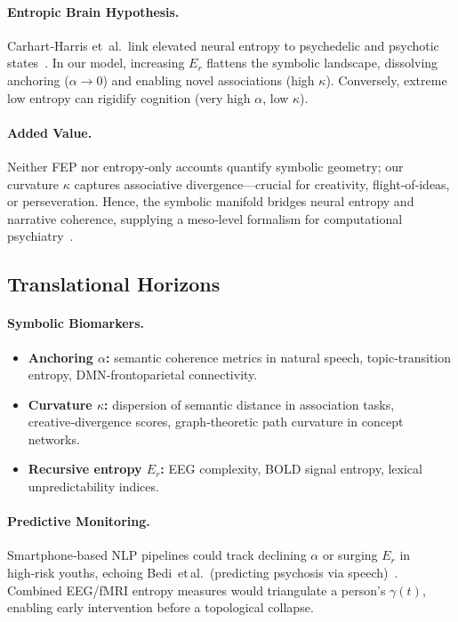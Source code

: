 \paragraph{Entropic Brain Hypothesis.}  Carhart‑Harris et al.\ link elevated neural entropy to psychedelic and psychotic states \cite{carhart2014entropic}. In our model, increasing $E_r$ flattens the symbolic landscape, dissolving anchoring ($\alpha \to 0$) and enabling novel associations (high $\kappa$). Conversely, extreme low entropy can rigidify cognition (very high $\alpha$, low $\kappa$).

\paragraph{Added Value.}  Neither FEP nor entropy‑only accounts quantify symbolic geometry; our curvature $\kappa$ captures associative divergence—crucial for creativity, flight‑of‑ideas, or perseveration. Hence, the symbolic manifold bridges neural entropy and narrative coherence, supplying a meso‑level formalism for computational psychiatry \cite{adams2016comp}.

\subsection*{Translational Horizons}

\paragraph{Symbolic Biomarkers.} 
\begin{itemize}
    \item \textbf{Anchoring $\alpha$:} semantic coherence metrics in natural speech, topic‑transition entropy, DMN‑frontoparietal connectivity.  
    \item \textbf{Curvature $\kappa$:} dispersion of semantic distance in association tasks, creative‑divergence scores, graph‑theoretic path curvature in concept networks.  
    \item \textbf{Recursive entropy $E_r$:} EEG complexity, BOLD signal entropy, lexical unpredictability indices.  
\end{itemize}

\paragraph{Predictive Monitoring.}  Smartphone‑based NLP pipelines could track declining $\alpha$ or surging $E_r$ in high‑risk youths, echoing Bedi et al.\ (predicting psychosis via speech) \cite{bedi2015speech}. Combined EEG/fMRI entropy measures would triangulate a person’s $\gamma(t)$, enabling early intervention before a topological collapse.

